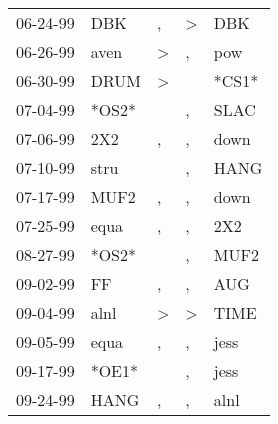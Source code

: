 \begin{supertabular}{p{0.07\textwidth}p{0.06\textwidth}p{0.02\textwidth}p{0.02\textwidth}p{0.06\textwidth}}
          06-24-99\textsuperscript{} &            DBK\textsuperscript{} &                , &     \textgreater &            DBK\textsuperscript{} \\
          06-26-99\textsuperscript{} &           aven\textsuperscript{} &     \textgreater &                , &            pow\textsuperscript{} \\
          06-30-99\textsuperscript{} &           DRUM\textsuperscript{} &     \textgreater &                  &                            *CS1* \\
          07-04-99\textsuperscript{} &                            *OS2* &                  &                , &           SLAC\textsuperscript{} \\
          07-06-99\textsuperscript{} &            2X2\textsuperscript{} &                , &                , &           down\textsuperscript{} \\
          07-10-99\textsuperscript{} &           stru\textsuperscript{} &                  &                , &           HANG\textsuperscript{} \\
          07-17-99\textsuperscript{} &           MUF2\textsuperscript{} &                , &                , &           down\textsuperscript{} \\
          07-25-99\textsuperscript{} &           equa\textsuperscript{} &                , &                , &            2X2\textsuperscript{} \\
          08-27-99\textsuperscript{} &                            *OS2* &                  &                , &           MUF2\textsuperscript{} \\
          09-02-99\textsuperscript{} &             FF\textsuperscript{} &                , &                , &            AUG\textsuperscript{} \\
          09-04-99\textsuperscript{} &           alnl\textsuperscript{} &     \textgreater &     \textgreater &           TIME\textsuperscript{} \\
          09-05-99\textsuperscript{} &           equa\textsuperscript{} &                , &                , &           jess\textsuperscript{} \\
          09-17-99\textsuperscript{} &                            *OE1* &                  &                , &           jess\textsuperscript{} \\
          09-24-99\textsuperscript{} &           HANG\textsuperscript{} &                , &                , &           alnl\textsuperscript{} \\

\end{supertabular}
